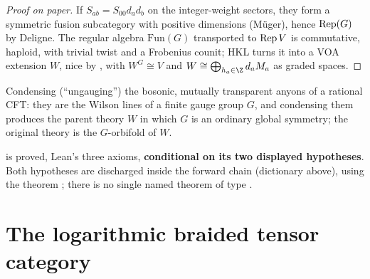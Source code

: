 \begin{proof}[Proof on paper]
If $S_{ab}=S_{00}d_ad_b$ on the integer-weight sectors, they form a symmetric fusion subcategory with positive dimensions
(Müger), hence $\operatorname{Rep}(G)$ by Deligne. The regular algebra $\mathrm{Fun}(G)$ transported to $\operatorname{Rep} V$ is commutative,
haploid, with trivial twist and a Frobenius counit; HKL turns it into a VOA extension $W$, nice by
, with $W^G\cong V$ and $W\cong\bigoplus_{h_a\in\Z}d_aM_a$ as graded spaces.
\end{proof}

\begin{physics}
Condensing (``ungauging'') the bosonic, mutually transparent anyons of a rational CFT: they are the Wilson lines of a
finite gauge group $G$, and condensing them produces the parent theory $W$ in which $G$ is an ordinary global symmetry;
the original theory is the $G$-orbifold of $W$.
\end{physics}

\begin{status}
 is proved, Lean's three axioms, \textbf{conditional on its two displayed hypotheses}. Both
hypotheses are discharged inside the forward chain (dictionary above), using the theorem ; there is no single
named theorem of type .
\end{status}

\section{The logarithmic braided tensor category}\label{l21:sec:log}

